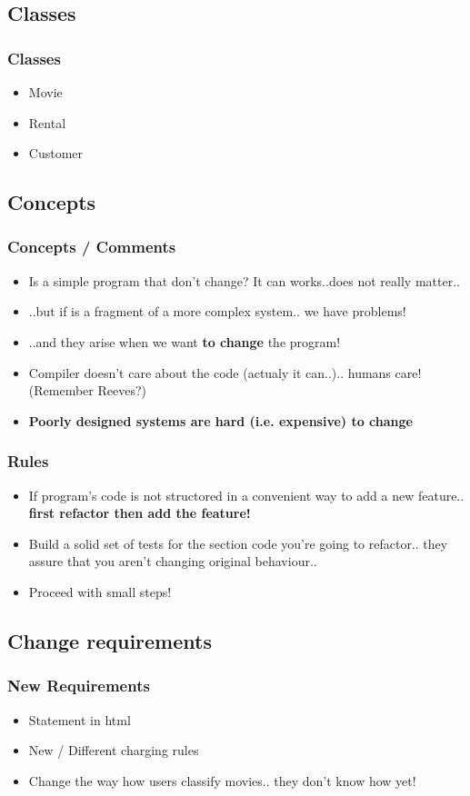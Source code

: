 \documentclass{beamer}
\begin{document}
\subsection{Classes}
\begin{frame}
  \frametitle{Classes}
  \begin{itemize}
  		\item Movie
		\item Rental
		\item Customer
  \end{itemize}
\end{frame}

\subsection{Concepts}
\begin{frame}
  \frametitle{Concepts / Comments}
  \begin{itemize}
  		\item<+-> Is a simple program that don't change? It can works..does not really matter..
		\item<+-> ..but if is a fragment of a more complex system.. we have problems!
		\item<+-> ..and they arise when we want \textbf{to change} the program!
		\item<+-> Compiler doesn't care about the code (actualy it can..).. humans care! (Remember Reeves?)
		\item<+-> \textbf{Poorly designed systems are hard (i.e. expensive) to change}
  \end{itemize}
\end{frame}

\begin{frame}
  \frametitle{Rules}
  \begin{itemize}
  	\item If program's code is not structored in a convenient way to add a new feature.. \textbf{first refactor then add the feature!}
  	\item  Build a solid set of tests for the section code you're going to refactor.. they assure that you aren't changing original behaviour.. 
  	\item Proceed with small steps!
    \end{itemize}
\end{frame}

\subsection{Change requirements}
\begin{frame}
  \frametitle{New Requirements}
  \begin{itemize}
  		\item Statement in html
		\item New / Different charging rules
		\item Change the way how users classify movies.. they don't know how yet!
  \end{itemize}
\end{frame}
\end{document}
